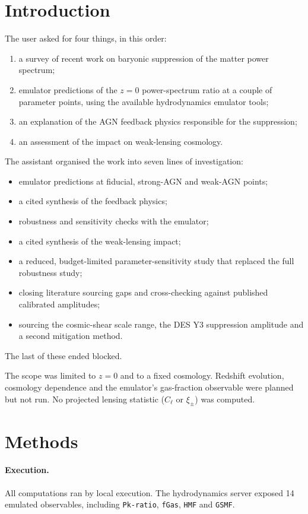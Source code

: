 \documentclass[11pt,a4paper]{article}
\begin{document}
\section{Introduction}

The user asked for four things, in this order:
\begin{enumerate}
\item a survey of recent work on baryonic suppression of the matter power spectrum;
\item emulator predictions of the $z=0$ power-spectrum ratio at a couple of parameter points, using the available hydrodynamics emulator tools;
\item an explanation of the AGN feedback physics responsible for the suppression;
\item an assessment of the impact on weak-lensing cosmology.
\end{enumerate}

The assistant organised the work into seven lines of investigation:
\begin{itemize}
\item emulator predictions at fiducial, strong-AGN and weak-AGN points;
\item a cited synthesis of the feedback physics;
\item robustness and sensitivity checks with the emulator;
\item a cited synthesis of the weak-lensing impact;
\item a reduced, budget-limited parameter-sensitivity study that replaced the full robustness study;
\item closing literature sourcing gaps and cross-checking against published calibrated amplitudes;
\item sourcing the cosmic-shear scale range, the DES Y3 suppression amplitude and a second mitigation method.
\end{itemize}
The last of these ended blocked.

The scope was limited to $z=0$ and to a fixed cosmology. Redshift evolution, cosmology dependence and the emulator's gas-fraction observable were planned but not run. No projected lensing statistic ($C_\ell$ or $\xi_\pm$) was computed.

\section{Methods}

\paragraph{Execution.} All computations ran by local execution. The hydrodynamics server exposed 14 emulated observables, including \texttt{Pk-ratio}, \texttt{fGas}, \texttt{HMF} and \texttt{GSMF}.
\end{document}
